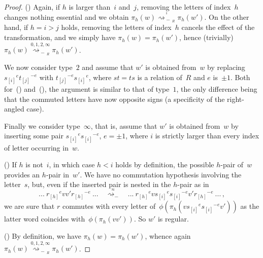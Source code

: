 \documentclass{amsart}
\numberwithin{equation}{section}
\theoremstyle{plain}
\theoremstyle{definition}
\newcounter{ITEM}
\begin{document}
\begin{proof}
{\setcounter{ITEM}{2}\leavevmode\hbox{\rm()}} Again, if ${h}$ is larger than~${i}$ and~${j}$, removing the letters of index~${h}$ changes nothing essential and we obtain $\pi_{h}({w}) {\mathrel{\overset{{}_{1}}{\rightsquigarrow_{\!\!\!\!\!\!-\,{{\!{}_{R}}}}}}} \pi_{h}({w}')$. On the other hand, if ${h} = {i} > {j}$ holds, removing the letters of index~${h}$ cancels the effect of the transformation, and we simply have $\pi_{h}({w}) = \pi_{h}({w}')$, hence (trivially) $\pi_{h}({w}){\mathrel{\overset{0,1,2,\infty}{\ \rightsquigarrow_{\!\!\!\!\!\!-\,{{\!{}_{R}}}}}}} \pi_{h}({w}')$.

We now consider type~$2$ and assume that ${w}'$ is obtained from~${w}$ by replacing ${{s}_{[{i}]}}^{e} {{t}_{[{j}]}}^{-{e}}$ with ${{t}_{[{j}]}}^{-{e}} {{s}_{[{i}]}}^{e}$, where ${s} {t} = {t} {s}$ is a relation of~${R}$ and ${e}$ is~$\pm1$. Both for~{\setcounter{ITEM}{1}\leavevmode\hbox{\rm()}} and~{\setcounter{ITEM}{2}\leavevmode\hbox{\rm()}}, the argument is similar to that of type~$1$, the only difference being that the commuted letters have now opposite signs (a specificity of the right-angled case).

Finally we consider type~$\infty$, that is, assume that ${w}'$ is obtained from~${w}$ by inserting some pair ${{s}_{[{i}]}}^{e} {{s}_{[{i}]}}^{-{e}}$, ${e} = \pm1$, where ${i}$ is strictly larger than every index of letter occurring in~${w}$. 

{\setcounter{ITEM}{1}\leavevmode\hbox{\rm()}} If ${h}$ is not~${i}$, in which case ${h} < {i}$ holds by definition, the possible ${h}$-pair of~${w}$ provides an ${h}$-pair in~${w}'$. We have no commutation hypothesis involving the letter~${s}$, but, even if the inserted pair is nested in the ${h}$-pair as in
$$ ... \ {{r}_{[{h}]}}^{e} {v}{v}' {{r}_{[{h}]}}^{-{e}} \ ... \quad {\mathrel{\overset{{}_{\infty}}{\rightsquigarrow_{\!\!\!\!\!\!-}}}} \quad ... \ {{r}_{[{h}]}}^{e} {v} {{s}_{[{i}]}}^{e} {{s}_{[{i}]}}^{-{e}} {v}' {{r}_{[{h}]}}^{-{e}} \ ... \, ,$$
we are sure that ${r}$ commutes with every letter of~$\phi(\pi_{h}({v} {{s}_{[{i}]}}^{e} {{s}_{[{i}]}}^{-{e}} {v}'))$ as the latter word coincides with~$\phi(\pi_{h}({v} {v}'))$. So ${w}'$ is regular.

{\setcounter{ITEM}{2}\leavevmode\hbox{\rm()}} By definition, we have $\pi_{h}({w}) = \pi_{h}({w}')$, whence again $\pi_{h}({w}){\mathrel{\overset{0,1,2,\infty}{\ \rightsquigarrow_{\!\!\!\!\!\!-\,{{\!{}_{R}}}}}}} \pi_{h}({w}')$.


\end{proof}
\end{document}
